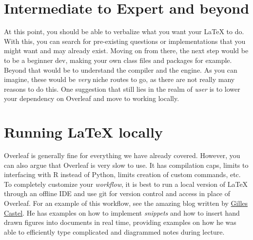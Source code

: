 \documentclass[]{article}
\begin{document}
\section{Intermediate to Expert and beyond}
At this point, you should be able to verbalize what you want your LaTeX to do. With this, you can search for pre-existing questions or implementations that you might want and may already exist. Moving on from there, the next step would be to be a beginner dev, making your own class files and packages for example. Beyond that would be to understand the compiler and the engine. As you can imagine, these would be \emph{very} niche routes to go, as there are not really many reasons to do this. One suggestion that still lies in the realm of \textit{user} is to lower your dependency on Overleaf and move to working locally.

\section{Running LaTeX locally}
Overleaf is generally fine for everything we have already covered. However, you can also argue that Overleaf is very slow to use. It has compilation caps, limits to interfacing with R instead of Python, limits creation of custom commands, etc. To completely customize your \emph{workflow}, it is best to run a local version of LaTeX through an offline IDE and use git for version control and access in place of Overleaf. For an example of this workflow, see the amazing blog written by \href{https://castel.dev/}{Gilles Castel}. He has examples on how to implement \textit{snippets} and how to insert hand drawn figures into documents in real time, providing examples on how he was able to efficiently type complicated and diagrammed notes during lecture.
\end{document}
